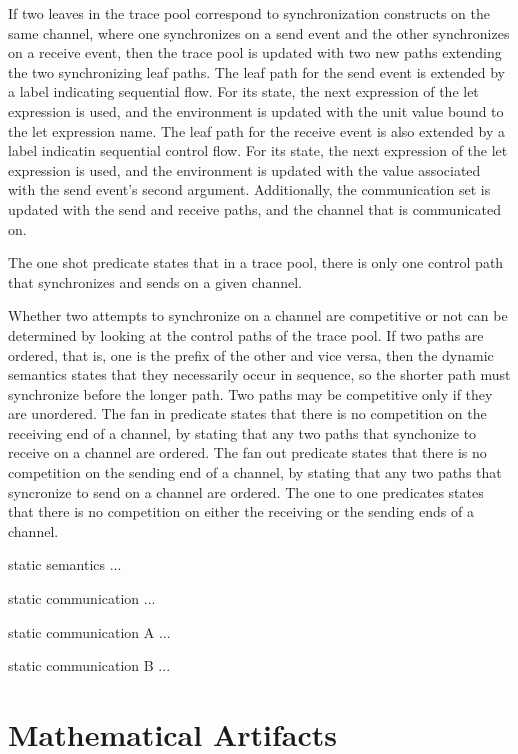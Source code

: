 \documentclass{article}
\begin{document}
If two leaves in the trace pool correspond to synchronization constructs on the same channel, where one synchronizes on a send event
and the other synchronizes on a receive event, then the trace pool is updated with two new paths extending the two synchronizing leaf paths.  The leaf path for the send event is extended by a label indicating sequential flow.  For its state, the next expression of the let expression is used, and the environment is updated with the unit value bound to the let expression name.  The leaf path for the receive event is also extended by a label indicatin sequential control flow.  For its state, the next expression of the let expression is used, and the environment is updated with the value associated with the send event's second argument.   Additionally, the communication set is updated with the send and receive paths, and the channel that is communicated on. 


The one shot predicate states that in a trace pool, there is only one control path that synchronizes and sends on a given channel.

Whether two attempts to synchronize on a channel are competitive or not can be determined by looking at the control paths of the trace pool.  If two paths are ordered, that is, one is the prefix of the other and vice versa, then the dynamic semantics states that they necessarily occur in sequence, so the shorter path must synchronize before the longer path.  Two paths may be competitive only if they are unordered. 
The fan in predicate states that there is no competition on the receiving end of a channel, by stating that any two paths that synchonize to receive on a channel are ordered.
The fan out predicate states that there is no competition on the sending end of a channel, by stating that any two paths that syncronize to send on a channel are ordered. 
The one to one predicates states that there is no competition on either the receiving or the sending ends of a channel. 



static semantics ...


static communication ...

static communication A ...


static communication B ...






\section{Mathematical Artifacts}
\end{document}
